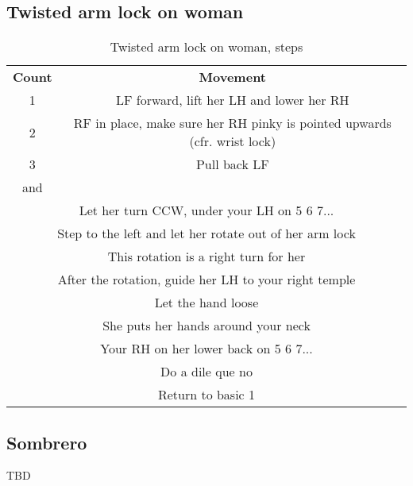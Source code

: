 \subsection{Twisted arm lock on woman}
\begin{table}[H]
\centering
\begin{tabular}{cc}
  \toprule
  \textbf{Count} & \textbf{Movement}\\
  \cmidrule(lr){1-1}\cmidrule(lr){2-2}
  1 & LF forward, lift her LH and lower her RH\\
  2 & RF in place, make sure her RH pinky is pointed upwards (cfr. wrist lock)\\
  3 & Pull back LF\\
  and &\\
  \multicolumn{2}{c}{Let her turn CCW, under your LH on 5 6 7...}\\
  \multicolumn{2}{c}{Step to the left and let her rotate out of her arm lock}\\
  \multicolumn{2}{c}{This rotation is a right turn for her}\\
  \multicolumn{2}{c}{After the rotation, guide her LH to your right temple}\\
  \multicolumn{2}{c}{Let the hand loose}\\
  \multicolumn{2}{c}{She puts her hands around your neck}\\
  \multicolumn{2}{c}{Your RH on her lower back on 5 6 7...}\\
  \multicolumn{2}{c}{Do a dile que no}\\
  \multicolumn{2}{c}{Return to basic 1}\\
  \bottomrule
\end{tabular}
\label{twisted_arm_lock_steps}
\caption{Twisted arm lock on woman, steps}
\end{table}

\subsection{Sombrero}
TBD

